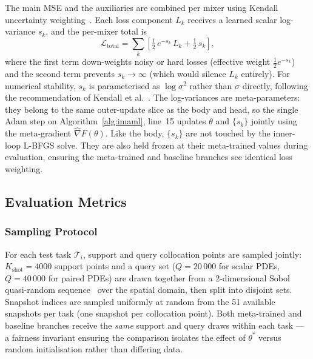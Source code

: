 \documentclass[10pt,journal,compsoc]{IEEEtran}
\begin{document}
The main MSE and the auxiliaries are combined per mixer using Kendall
uncertainty weighting~\cite{kendall2018}. Each loss component
$L_k$ receives a learned scalar log-variance $s_k$, and the per-mixer
total is
\begin{equation}\label{eq:kendall_total}
\mathcal{L}_{\text{total}} =
\sum_k \left[
   \tfrac{1}{2}\, e^{-s_k}\, L_k
   + \tfrac{1}{2}\, s_k
\right],
\end{equation}
where the first term down-weights noisy or hard losses (effective
weight $\tfrac{1}{2} e^{-s_k}$) and the second term prevents
$s_k \to \infty$ (which would silence $L_k$ entirely). For numerical
stability, $s_k$ is parameterised as $\log \sigma^2$ rather than $\sigma$
directly, following the recommendation of
Kendall et al.~\cite{kendall2018}. The log-variances are
meta-parameters: they belong to the same outer-update slice as the body
and head, so the single Adam step on
Algorithm~\ref{alg:imaml}, line~15 updates $\theta$ and $\{s_k\}$
jointly using the meta-gradient
$\hat{\nabla} F(\theta)$. Like the body, $\{s_k\}$ are not touched by
the inner-loop L-BFGS solve. They are also held frozen at their
meta-trained values during evaluation, ensuring the meta-trained and
baseline branches see identical loss weighting.

\subsection{Evaluation Metrics}\label{subsec:evaluation_metrics}

\subsubsection{Sampling Protocol}\label{subsubsec:sampling_protocol}

For each test task $\mathcal{T}_i$, support and query collocation points
are sampled jointly: $K_{\text{shot}} = 4000$ support points and a query
set ($Q = 20\,000$ for scalar PDEs, $Q = 40\,000$ for paired PDEs) are
drawn together from a 2-dimensional Sobol quasi-random
sequence~\cite{wu2023} over the spatial domain, then split into
disjoint sets. Snapshot indices are sampled uniformly at random from the
51 available snapshots per task (one snapshot per collocation point).
Both meta-trained and baseline branches receive the \emph{same} support
and query draws within each task --- a fairness invariant ensuring the
comparison isolates the effect of $\theta^*$ versus random initialisation
rather than differing data.
\end{document}
